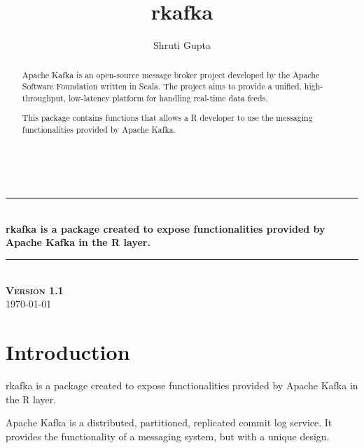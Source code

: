 \documentclass[english,pdftex,a4paper]{article}
\newcommand{\HRule}{\rule{\linewidth}{0.5mm}}
\begin{document}


\begin{titlepage}
\begin{center}

\title{rkafka}
\author{Shruti Gupta}


 \\[0.5cm]

\HRule \\[0.4cm]
{\Large{\textbf{rkafka is a package created to expose functionalities provided by Apache Kafka in the R layer.}}} \\[0.3cm]
\HRule \\[0.5cm]

\textsc{\large{\textbf{Version 1.1}}} \\[0.3cm]

\vfill
\textsc{\Large \today}

\end{center}
\end{titlepage}

\maketitle{}
\tableofcontents{}
\clearpage{}

\begin{abstract}
\par{Apache Kafka is an open-source message broker project developed by the Apache Software Foundation written in Scala. The project aims to provide a unified, high-throughput, low-latency platform for handling real-time data feeds.}
\par{This package contains functions that allows a R developer to use the messaging functionalities provided by Apache Kafka.}
\end{abstract}
\clearpage{}
\section{Introduction}
\par{rkafka is a package created to expose functionalities provided by Apache Kafka in the R layer.}
\par{Apache Kafka is a distributed, partitioned, replicated commit log service. It provides the functionality of a messaging system, but with a unique design.}
\end{document}
